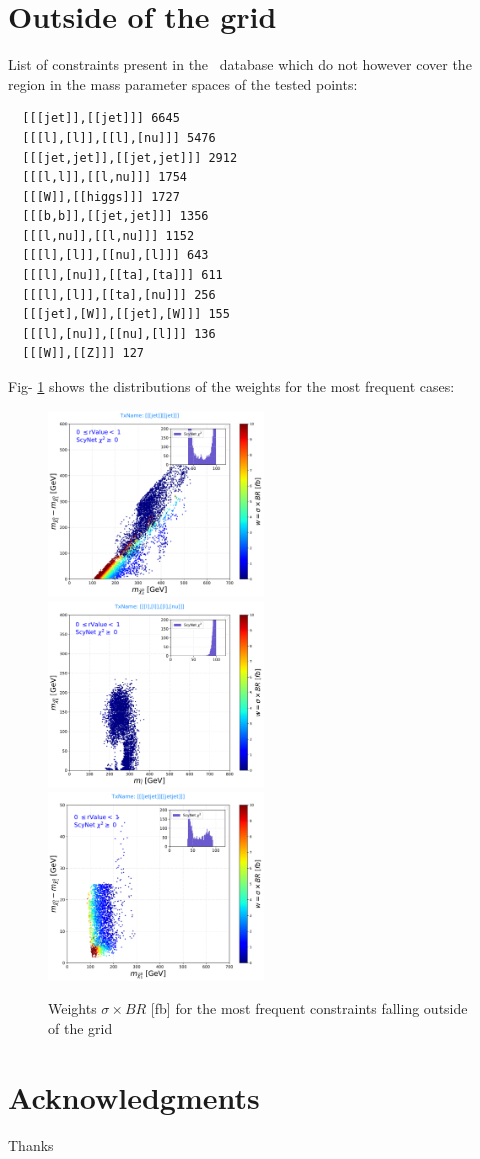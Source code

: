 \documentclass[a4paper,11pt]{article}
\begin{document}
\section{Outside of the grid}
List of constraints present in the \SMO~database which do not however cover the region in the mass parameter spaces of the tested points:
\begin{verbatim}
  [[[jet]],[[jet]]] 6645
  [[[l],[l]],[[l],[nu]]] 5476
  [[[jet,jet]],[[jet,jet]]] 2912
  [[[l,l]],[[l,nu]]] 1754
  [[[W]],[[higgs]]] 1727
  [[[b,b]],[[jet,jet]]] 1356
  [[[l,nu]],[[l,nu]]] 1152
  [[[l],[l]],[[nu],[l]]] 643
  [[[l],[nu]],[[ta],[ta]]] 611
  [[[l],[l]],[[ta],[nu]]] 256
  [[[jet],[W]],[[jet],[W]]] 155
  [[[l],[nu]],[[nu],[l]]] 136
  [[[W]],[[Z]]] 127
\end{verbatim}
Fig- \ref{outside} shows the distributions of the weights for the most frequent cases:
\begin{figure}[!b]
	\centering
	\subfigure
	{ \includegraphics[width=0.51\textwidth]{Fig/Res/Outside_Weights/2jet.pdf}}
	\subfigure
	{\includegraphics[width=0.51\textwidth]{Fig/Res/Outside_Weights/3lep.pdf}}
	\subfigure
	{\includegraphics[width=0.51\textwidth]{Fig/Res/Outside_Weights/4jet.pdf}}	

	\caption{Weights $\sigma \times BR$ [fb] for the most frequent constraints falling outside of the grid}
	\label{outside}
\end{figure}





\clearpage


\section*{Acknowledgments}
Thanks
%


\end{document}
